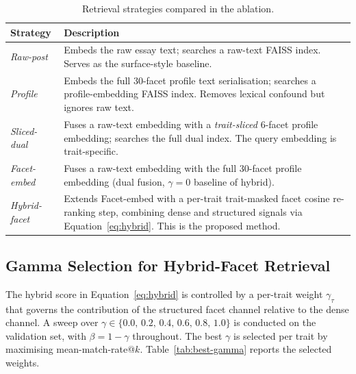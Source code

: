 \documentclass[../main.tex]{subfiles}
\begin{document}
\begin{table}[htbp]
  \centering
  \caption{Retrieval strategies compared in the ablation.}
  \label{tab:strategies}
  \small
  \begin{tabular}{lp{9cm}}
    \toprule
    \textbf{Strategy} & \textbf{Description} \\
    \midrule
    \textit{Raw-post}     & Embeds the raw essay text; searches a raw-text FAISS index.
                            Serves as the surface-style baseline. \\
    \textit{Profile}      & Embeds the full 30-facet profile text serialisation;
                            searches a profile-embedding FAISS index.
                            Removes lexical confound but ignores raw text. \\
    \textit{Sliced-dual}  & Fuses a raw-text embedding with a \emph{trait-sliced}
                            6-facet profile embedding; searches the full dual index.
                            The query embedding is trait-specific. \\
    \textit{Facet-embed}  & Fuses a raw-text embedding with the full 30-facet profile
                            embedding (dual fusion, $\gamma=0$ baseline of hybrid). \\
    \textit{Hybrid-facet} & Extends Facet-embed with a per-trait trait-masked facet
                            cosine re-ranking step, combining dense and structured
                            signals via Equation~\eqref{eq:hybrid}.
                            This is the proposed method. \\
    \bottomrule
  \end{tabular}
\end{table}

\subsection{Gamma Selection for Hybrid-Facet Retrieval}

The hybrid score in Equation~\eqref{eq:hybrid} is controlled by a per-trait
weight $\gamma_\tau$ that governs the contribution of the structured facet
channel relative to the dense channel.
A sweep over $\gamma \in \{0.0,\,0.2,\,0.4,\,0.6,\,0.8,\,1.0\}$ is conducted
on the validation set, with $\beta = 1-\gamma$ throughout.
The best $\gamma$ is selected per trait by maximising mean-match-rate@$k$.
Table~\ref{tab:best-gamma} reports the selected weights.
\end{document}
